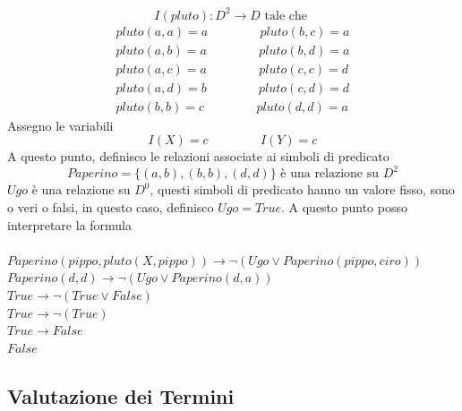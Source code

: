 \documentclass[12pt, letterpaper]{article}
\newcommand{\acc}{\\\hphantom{}\\}
\begin{document}
$$ I(pluto) : D^2\rightarrow D\text{ tale che }$$ $$
\begin{matrix}
    pluto(a,a)=a\;\;\;\;\;\;\;\;\;\;\;\;\;\;\;pluto(b,c)=a\\
    pluto(a,b)=a\;\;\;\;\;\;\;\;\;\;\;\;\;\;\;pluto(b,d)=a\\
    pluto(a,c)=a\;\;\;\;\;\;\;\;\;\;\;\;\;\;\;pluto(c,c)=d\\
    pluto(a,d)=b\;\;\;\;\;\;\;\;\;\;\;\;\;\;\;pluto(c,d)=d\\
    pluto(b,b)=c\;\;\;\;\;\;\;\;\;\;\;\;\;\;\;pluto(d,d)=a
\end{matrix}$$
Assegno le variabili $$I(X)=c\;\;\;\;\;\;\;\;\;\;\;\;\;\;\;I(Y)=c $$ 
A questo punto, definisco le relazioni associate ai simboli di predicato 
$$ Paperino = \{(a,b),(b,b),(d,d)\}\text{ è una relazione su }D^2$$
$Ugo$ è una relazione su $D^0$, questi simboli di predicato hanno un valore fisso, sono o veri o falsi, in 
questo caso, definisco $Ugo=True$. 
A questo punto posso interpretare la formula\acc
$ Paperino(pippo,pluto(X,pippo))\rightarrow \lnot (Ugo\lor Paperino(pippo,ciro))$\\
$ Paperino(d,d)\rightarrow \lnot (Ugo\lor Paperino(d,a))$\\
$ True \rightarrow \lnot (True \lor False)$\\
$ True \rightarrow \lnot(True)$\\
$True \rightarrow False $\\
$ False $
\subsection{Valutazione dei Termini} 
\newpage 
\end{document}
